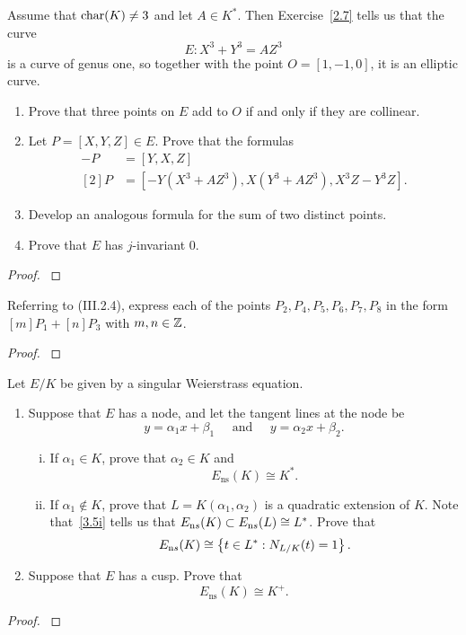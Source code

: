 \documentclass[12pt,reqno]{amsart}
\begin{document}
\begin{exe}\label{3.3}
Assume that ${\operatorname{char}}(K)\neq 3$ and let $A \in K^\ast$.  Then Exercise~\ref{2.7} tells us that the curve
\[
E: X^3+Y^3=AZ^3
\]
is a curve of genus one, so together with the point $O=[1, -1, 0]$, it is an elliptic curve.
\begin{enumerate}
\item
Prove that three points on $E$ add to $O$ if and only if they are collinear.
\item
Let $P=[X, Y, Z]\in E$.  Prove that the formulas
\begin{align*}
-P&=[Y, X, Z]\\
[2]P&=[-Y(X^3+AZ^3), X(Y^3+AZ^3), X^3Z-Y^3Z].
\end{align*}

\item
Develop an analogous formula for the sum of two distinct points.

\item
Prove that $E$ has $j$-invariant $0$.
\end{enumerate}
\begin{proof}\label{s3.3}

\end{proof} 
\end{exe} 

\begin{exe}\label{3.4}	
Referring to (III.2.4), express each of the points $P_2, P_4, P_5, P_6, P_7, P_8$ in the form $[m]P_1+[n]P_3$ with $m, n \in {\mathbb Z}$.
\begin{proof}\label{s3.4}

\end{proof} 
\end{exe} 

\begin{exe}\label{3.5}
Let $E/K$ be given by a singular Weierstrass equation.
\begin{enumerate}
\item
Suppose that $E$ has a node, and let the tangent lines at the node be
\[
y=\alpha_1x+\beta_1 \;\;\;\;\;\mbox{and}\;\;\;\;\;y=\alpha_2 x+\beta_2.
\]
\begin{enumerate}[(i)]
\item\label{3.5i}
If $\alpha_1 \in K$, prove that $\alpha_2 \in K$ and
\[
E_{\text{ns}}(K)\cong K^\ast.
\]
\item\label{3.5ii}
If $\alpha_1 \not\in K$, prove that $L= K(\alpha_1, \alpha_2)$ is a quadratic extension of $K$. Note that~\ref{3.5i} tells us that $E_{\text ns}(K)\subset E_{\text ns}(L) \cong L^\ast$.  Prove that
\[
E_{\text ns}(K)\cong \left\{t \in L^\ast : N_{L/K}(t)=1 \right\}.
\]

\end{enumerate}
\item
Suppose that $E$ has a cusp.  Prove that 
\[
E_{\text{ns}}(K)\cong K^+.
\]
\end{enumerate}
\begin{proof}\label{s3.5}

\end{proof} 
\end{exe} 
\end{document}
